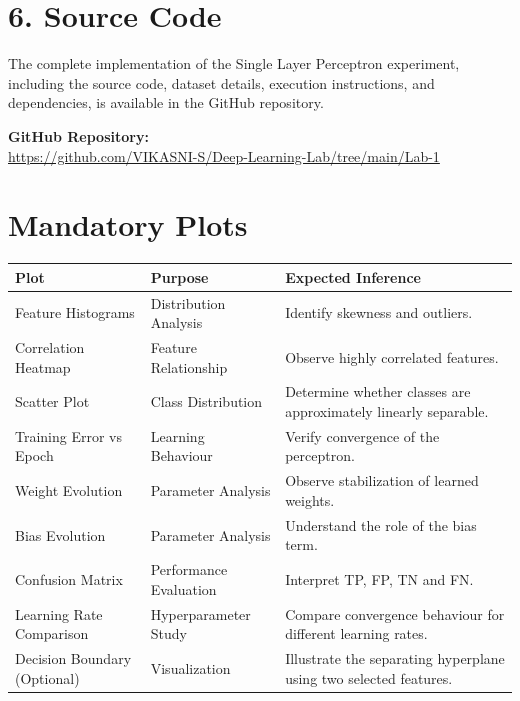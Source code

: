 \documentclass[11pt]{article}
\begin{document}

\section*{6. Source Code}


The complete implementation of the Single Layer Perceptron experiment, including the source code, dataset details, execution instructions, and dependencies, is available in the GitHub repository.

\noindent\textbf{GitHub Repository:} \\
\url{https://github.com/VIKASNI-S/Deep-Learning-Lab/tree/main/Lab-1}\\


\section{Mandatory Plots}

\begin{longtable}{|p{3.5cm}|p{3.5cm}|p{6cm}|}
\hline
\textbf{Plot} & \textbf{Purpose} & \textbf{Expected Inference} \\
\hline
Feature Histograms & Distribution Analysis & Identify skewness and outliers.\\
\hline
Correlation Heatmap & Feature Relationship & Observe highly correlated features.\\
\hline
Scatter Plot & Class Distribution & Determine whether classes are approximately linearly separable.\\
\hline
Training Error vs Epoch & Learning Behaviour & Verify convergence of the perceptron.\\
\hline
Weight Evolution & Parameter Analysis & Observe stabilization of learned weights.\\
\hline
Bias Evolution & Parameter Analysis & Understand the role of the bias term.\\
\hline
Confusion Matrix & Performance Evaluation & Interpret TP, FP, TN and FN.\\
\hline
Learning Rate Comparison & Hyperparameter Study & Compare convergence behaviour for different learning rates.\\
\hline
Decision Boundary (Optional) & Visualization & Illustrate the separating hyperplane using two selected features.\\
\hline
\end{longtable}

\end{document}
